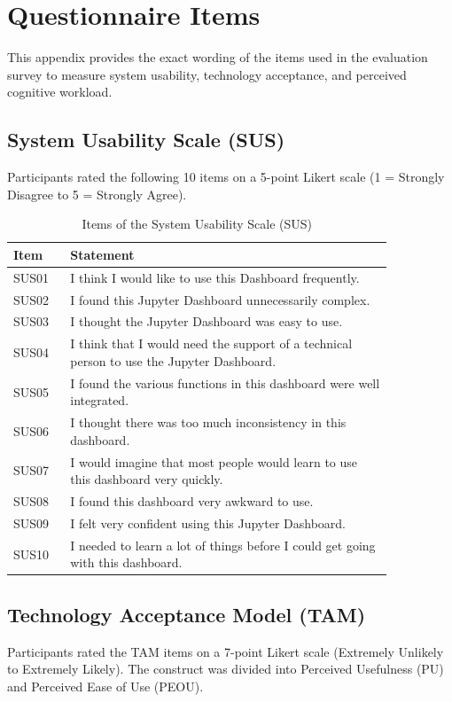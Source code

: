 \section{Questionnaire Items}
\label{sec:appendix_questionnaires}
This appendix provides the exact wording of the items used in the evaluation survey to measure system usability, technology acceptance, and perceived cognitive workload.

\subsection{System Usability Scale (SUS)}
Participants rated the following 10 items on a 5-point Likert scale (1 = Strongly Disagree to 5 = Strongly Agree). 

\begin{table}[htpb]
  \centering
  \caption{Items of the System Usability Scale (SUS)}
  \label{tab:app_sus}
  \begin{tabular}{lp{0.85\linewidth}}
    \toprule
    \textbf{Item} & \textbf{Statement} \\
    \midrule
    SUS01 & I think I would like to use this Dashboard frequently. \\
    SUS02 & I found this Jupyter Dashboard unnecessarily complex. \\
    SUS03 & I thought the Jupyter Dashboard was easy to use. \\
    SUS04 & I think that I would need the support of a technical person to use the Jupyter Dashboard. \\
    SUS05 & I found the various functions in this dashboard were well integrated. \\
    SUS06 & I thought there was too much inconsistency in this dashboard. \\
    SUS07 & I would imagine that most people would learn to use this dashboard very quickly. \\
    SUS08 & I found this dashboard very awkward to use. \\
    SUS09 & I felt very confident using this Jupyter Dashboard. \\
    SUS10 & I needed to learn a lot of things before I could get going with this dashboard. \\
    \bottomrule
  \end{tabular}
\end{table}

\subsection{Technology Acceptance Model (TAM)}
Participants rated the TAM items on a 7-point Likert scale (Extremely Unlikely to Extremely Likely). The construct was divided into Perceived Usefulness (PU) and Perceived Ease of Use (PEOU).

